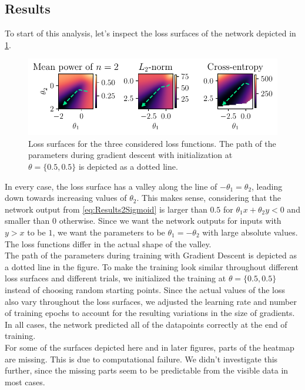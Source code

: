 \subsection{Results}\label{sec:ResultsOf2ParameterNetwork}
To start of this analysis, let's inspect the loss surfaces of the network depicted in \cref{fig:Results2LossSurfaces}.
\begin{figure}
	\centering
	\includegraphics{Experiment2/plots/LossSurfaces.pdf}
	\caption{Loss surfaces for the three considered loss functions. The path of the parameters during gradient descent with initialization at $\theta = \{0.5, 0.5\}$ is depicted as a dotted line.}
	\label{fig:Results2LossSurfaces}
\end{figure}
In every case, the loss surface has a valley along the line of $-\theta_1 = \theta_2$, leading down towards increasing values of  $\theta_2$. This makes sense, considering that the network output from \cref{eq:Results2Sigmoid} is larger than $0.5$ for $\theta_1x + \theta_2y < 0$ and smaller than $0$ otherwise. Since we want the network outputs for inputs with $y>x$ to be $1$, we want the parameters to be $\theta_1 = - \theta_2$ with large absolute values. The loss functions differ in the actual shape of the valley.\\
The path of the parameters during training with Gradient Descent is depicted as a dotted line in the figure. To make the training look similar throughout different loss surfaces and different trials, we initialized the training at $\theta = \{0.5, 0.5\}$ instead of choosing random starting points. Since the actual values of the loss also vary throughout the loss surfaces, we adjusted the learning rate and number of training epochs to account for the resulting variations in the size of gradients. In all cases, the network predicted all of the datapoints correctly at the end of training.\\
For some of the surfaces depicted here and in later figures, parts of the heatmap are missing. This is due to computational failure. We didn't investigate this further, since the missing parts seem to be predictable from the visible data in most cases.\\
